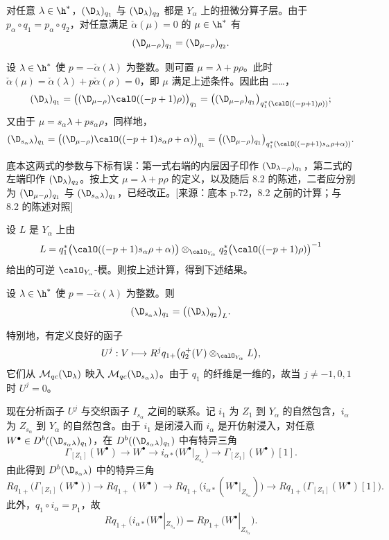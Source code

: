对任意 $\lambda\in\h^*$，$(\D_\lambda)_{q_1}$ 与 $(\D_\lambda)_{q_2}$ 都是 $Y_\alpha$ 上的扭微分算子层。由于 $p_\alpha\circ q_1=p_\alpha\circ q_2$，对任意满足 $\check\alpha(\mu)=0$ 的 $\mu\in\h^*$ 有
$$(\D_{\mu-\rho})_{q_1}=(\D_{\mu-\rho})_{q_2}.$$

设 $\lambda\in\h^*$ 使 $p=-\check\alpha(\lambda)$ 为整数。则可置 $\mu=\lambda+p\rho$。此时 $\check\alpha(\mu)=\check\alpha(\lambda)+p\check\alpha(\rho)=0$，即 $\mu$ 满足上述条件。因此由 ……，
$$(\D_\lambda)_{q_1}=\bigl((\D_{\mu-\rho})\calO((-p+1)\rho)\bigr)_{q_1}
=\bigl((\D_{\mu-\rho})_{q_1}\bigr)_{q_1^*(\calO((-p+1)\rho))};$$
又由于 $\mu=s_\alpha\lambda+p s_\alpha\rho$，同样地，
$$(\D_{s_\alpha\lambda})_{q_1}=\bigl((\D_{\mu-\rho})\calO((-p+1)s_\alpha\rho+\alpha)\bigr)_{q_1}
=\bigl((\D_{\mu-\rho})_{q_1}\bigr)_{q_1^*(\calO((-p+1)s_\alpha\rho+\alpha))}.$$
\begin{annote}
底本这两式的参数与下标有误：第一式右端的内层因子印作 $(\D_{\lambda-\rho})_{q_1}$，第二式的左端印作 $(\D_\lambda)_{q_2}$。按上文 $\mu=\lambda+p\rho$ 的定义，以及随后 8.2 的陈述，二者应分别为 $(\D_{\mu-\rho})_{q_1}$ 与 $(\D_{s_\alpha\lambda})_{q_1}$，已经改正。[来源：底本 p.72，8.2 之前的计算；与 8.2 的陈述对照]
\end{annote}

设 $L$ 是 $Y_\alpha$ 上由
$$L=q_1^*\bigl(\calO((-p+1)s_\alpha\rho+\alpha)\bigr)\otimes_{\calO_{Y_\alpha}}q_2^*\bigl(\calO((-p+1)\rho)\bigr)^{-1}$$
给出的可逆 $\calO_{Y_\alpha}$-模。则按上述计算，得到下述结果。

\begin{lemma}\label{lem:03.8.2}
设 $\lambda\in\h^*$ 使 $p=-\check\alpha(\lambda)$ 为整数。则
$$(\D_{s_\alpha\lambda})_{q_1}=\bigl((\D_\lambda)_{q_2}\bigr)_L.$$
\end{lemma}

特别地，有定义良好的函子
$$U^j:V\longmapsto R^jq_{1+}\bigl(q_2^+(V)\otimes_{\calO_{Y_\alpha}}L\bigr),$$
它们从 $\mathcal{M}_{qc}(\D_\lambda)$ 映入 $\mathcal{M}_{qc}(\D_{s_\alpha\lambda})$。由于 $q_1$ 的纤维是一维的，故当 $j\ne-1,0,1$ 时 $U^j=0$。

现在分析函子 $U^j$ 与交织函子 $I_{s_\alpha}$ 之间的联系。记 $i_1$ 为 $Z_1$ 到 $Y_\alpha$ 的自然包含，$i_\alpha$ 为 $Z_{s_\alpha}$ 到 $Y_\alpha$ 的自然包含。由于 $i_1$ 是闭浸入而 $i_\alpha$ 是开仿射浸入，对任意 $W^\bullet\in D^b((\D_{s_\alpha\lambda})_{q_1})$，在 $D^b((\D_{s_\alpha\lambda})_{q_1})$ 中有特异三角
$$\Gamma_{[Z_1]}(W^\bullet)\longrightarrow W^\bullet\longrightarrow i_{\alpha*}\bigl(W^\bullet|_{Z_{s_\alpha}}\bigr)\longrightarrow\Gamma_{[Z_1]}(W^\bullet)[1].$$
由此得到 $D^b(\D_{s_\alpha\lambda})$ 中的特异三角
$$Rq_{1+}\bigl(\Gamma_{[Z_1]}(W^\bullet)\bigr)\longrightarrow Rq_{1+}(W^\bullet)\longrightarrow Rq_{1+}\bigl(i_{\alpha*}(W^\bullet|_{Z_{s_\alpha}})\bigr)\longrightarrow Rq_{1+}\bigl(\Gamma_{[Z_1]}(W^\bullet)[1]\bigr).$$
此外，$q_1\circ i_\alpha=p_1$，故
$$Rq_{1+}\bigl(i_{\alpha*}(W^\bullet|_{Z_{s_\alpha}})\bigr)=Rp_{1+}\bigl(W^\bullet|_{Z_{s_\alpha}}\bigr).$$

